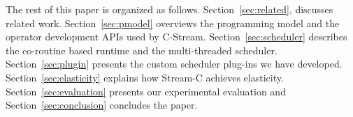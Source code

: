 The rest of this paper is organized as follows. Section~\ref{sec:related},
discusses related work. Section~\ref{sec:pmodel} overviews the programming
model and the operator development APIs used by C-Stream.
Section~\ref{sec:scheduler} describes the co-routine based runtime and the
multi-threaded scheduler. Section~\ref{sec:plugin} presents the custom
scheduler plug-ins we have developed. Section~\ref{sec:elasticity} explains
how Stream-C achieves elasticity. Section~\ref{sec:evaluation} presents our
experimental evaluation and Section~\ref{sec:conclusion} concludes the paper.


